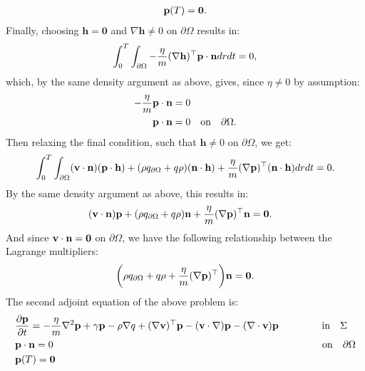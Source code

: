 \begin{align}
\mathbf{p}(T)=\mathbf{0}.
\end{align}
Finally, choosing $\mathbf{h}=\mathbf{0}$ and $\nabla \mathbf{h}  \neq 0$ on $\partial \Omega$ results in:
\begin{align*}
\int_0^T \int_{\partial \Omega} - \frac{\eta}{m} (\nabla \mathbf{h})^\top \mathbf{p} \cdot \mathbf{n} dr dt = 0,
\end{align*}
which, by the same density argument as above, gives, since $\eta \neq 0$ by assumption:
\begin{align}
\label{CondAdj1}
- \frac{\eta}{m}  \mathbf{p}  \cdot \mathbf{n}&= 0  \notag\\
 \mathbf{p}  \cdot \mathbf{n} &= 0 \quad \text{on} \quad \partial \Omega.
\end{align}
Then relaxing the final condition, such that $\mathbf{h} \neq 0$ on $\partial \Omega$, we get:
\begin{align*}
\int_0^T \int_{\partial\Omega} (\mathbf{v} \cdot \mathbf{n})(\mathbf{p} \cdot \mathbf{h}) +(\rho  {q}_{\partial \Omega} + q \rho)  (\mathbf{n}\cdot \mathbf{h}) +\frac{\eta}{m}  (\nabla \mathbf{p})^\top ( \mathbf{n}\cdot \mathbf{h})dr dt=0.
\end{align*}
By the same density argument as above, this results in:
\begin{align*}
&(\mathbf{v} \cdot \mathbf{n})\mathbf{p}  +(\rho  {q}_{\partial \Omega} + q \rho)\mathbf{n}+\frac{\eta}{m}  (\nabla \mathbf{p})^\top \mathbf{n} =\mathbf{0}.
\end{align*}
And since $\mathbf{v} \cdot \mathbf{n} = \mathbf{0}$ on $\partial \Omega$, we have the following relationship between the Lagrange multipliers:
\begin{align*}
\bigg(\rho  {q}_{\partial \Omega} + q \rho+\frac{\eta}{m}  (\nabla \mathbf{p})^\top \bigg) \mathbf{n} =\mathbf{0}.
\end{align*}
The second adjoint equation of the above problem is:
\begin{align}
\label{eqn:INAdj2}
&\frac{\partial \Adja}{\partial t} =  - \frac{\eta}{m} \nabla^2 \Adja  + \gamma\Adja-\Sta\nabla \Adjb +(\nabla \Stav)^\top\Adja 
- (\Stav \cdot \nabla)\Adja -  (\nabla \cdot \Stav)\Adja     \ \qquad\qquad \text{in} \quad \Sigma\\
&\Adja \cdot \mathbf{n} = 0 \qquad \qquad \qquad \qquad \qquad \qquad \qquad \qquad \qquad \qquad \qquad\qquad \qquad\quad \text{on} \quad \partial \Omega \notag \\
&\Adja(T)=\mathbf{0} \notag
\end{align}

